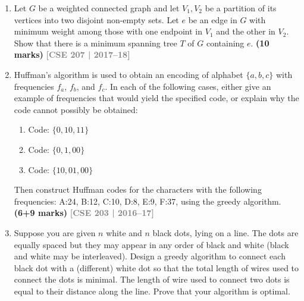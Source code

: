 \documentclass[12pt,a3paper]{article}
\newcommand{\yr}[1]{\hfill\textcolor{gray}{\small\textbf{[#1]}}}
\newcommand{\mk}[1]{\textcolor{orange!70!black}{\small\textbf{(#1 marks)}}}
\begin{document}
\begin{enumerate}

\item Let $G$ be a weighted connected graph and let $V_1, V_2$ be a partition of its vertices into two disjoint non-empty sets. Let $e$ be an edge in $G$ with minimum weight among those with one endpoint in $V_1$ and the other in $V_2$. Show that there is a minimum spanning tree $T$ of $G$ containing $e$. \mk{10}
\yr{CSE 207 | 2017--18}

\item Huffman's algorithm is used to obtain an encoding of alphabet $\{a, b, c\}$ with frequencies $f_a$, $f_b$, and $f_c$. In each of the following cases, either give an example of frequencies that would yield the specified code, or explain why the code cannot possibly be obtained:
\begin{enumerate}
  \item Code: $\{0, 10, 11\}$
  \item Code: $\{0, 1, 00\}$
  \item Code: $\{10, 01, 00\}$
\end{enumerate}
Then construct Huffman codes for the characters with the following frequencies: A:24, B:12, C:10, D:8, E:9, F:37, using the greedy algorithm. \mk{6+9}
\yr{CSE 203 | 2016--17}

\item Suppose you are given $n$ white and $n$ black dots, lying on a line. The dots
are equally spaced but they may appear in any order of black and white (black and
white may be interleaved). Design a greedy algorithm to connect each black dot with
a (different) white dot so that the total length of wires used to connect the dots
is minimal. The length of wire used to connect two dots is equal to their distance
along the line. Prove that your algorithm is optimal.


\end{enumerate}
\end{document}
